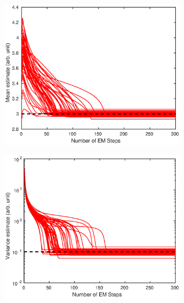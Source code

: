 \documentclass[12pt]{report}
\begin{document}
\begin{figure}
	\begin{subfigure}{0.5\textwidth}
		\includegraphics[width=\textwidth]{figures/hierarchicalModel/EM_repeat_mean.eps}
	\end{subfigure}
	\begin{subfigure}{0.5\textwidth}
		\includegraphics[width=\textwidth]{figures/hierarchicalModel/EM_repeat_variance.eps}
	\end{subfigure}
	\begin{subfigure}{0.5\textwidth}

\end{subfigure}
\end{figure}
\end{document}
